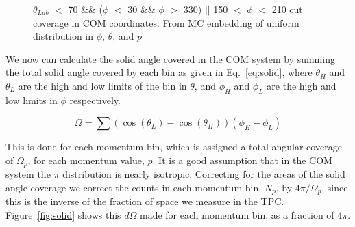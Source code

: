\documentclass[12pt, letterpaper, twoside]{article}
\begin{document}
\begin{figure}
\begin{adjustbox}{max width=1.2\linewidth,center}
\centering
{}%
%
%
\end{adjustbox}
\caption{$\theta_{Lab}$ $<$ 70 \&\& ($\phi$ $<$ 30 \&\& $\phi$ $>$ 330) $||$ 150 $<$ $\phi$ $<$ 210 cut coverage in COM coordinates. From MC embedding of uniform distribution in $\phi$, $\theta$, and $p$}
\end{figure}
 
 We now can calculate the solid angle covered in the COM system by summing the total solid angle covered by each bin as given in Eq.~\ref{eq:solid}, where $\theta_H$ and $\theta_L$ are the high and low limits of the bin in $\theta$, and $\phi_H$ and $\phi_L$ are the high and low limits in $\phi$ respectively. 
 
 \begin{equation}
 \Omega = \sum (\cos(\theta_L) - \cos(\theta_H))(\phi_H - \phi_L)
 \label{eq:solid}
 \end{equation}
 
 This is done for each momentum bin, which is assigned a total angular coverage of $\Omega_p$, for each momentum value, $p$. It is a good assumption that in the COM system the $\pi$ distribution is nearly isotropic. Correcting for the areas of the solid angle coverage we correct the counts in each momentum bin, $N_p$, by ${4\pi/\Omega_p}$, since this is the inverse of the fraction of space we measure in the TPC. Figure~\ref{fig:solid} shows this $d\Omega$ made for each momentum bin, as a fraction of $4\pi$. 
  
\end{document}
